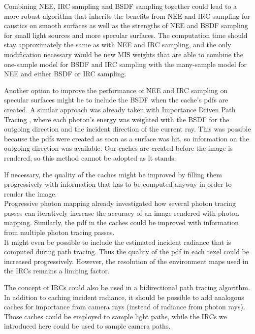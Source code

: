 Combining NEE, IRC sampling and BSDF sampling together could lead to a more robust algorithm that inherits the benefits from NEE and IRC sampling for caustics on smooth surfaces as well as the strengths of NEE and BSDF sampling for small light sources and more specular surfaces. The computation time should stay approximately the same as with NEE and IRC sampling, and the only modification necessary would be new MIS weights that are able to combine the one-sample model for BSDF and IRC sampling with the many-sample model for NEE and either BSDF or IRC sampling.

\newpage
Another option to improve the performance of NEE and IRC sampling on specular surfaces might be to include the BSDF when the cache's pdfs are created. A similar approach was already taken with Importance Driven Path Tracing \cite{idpt}, where each photon's energy was weighted with the BSDF for the outgoing direction and the incident direction of the current ray. This was possible because the pdfs were created as soon as a surface was hit, so information on the outgoing direction was available. Our caches are created before the image is rendered, so this method cannot be adopted as it stands.


If necessary, the quality of the caches might be improved by filling them progressively with information that has to be computed anyway in order to render the image.\\
Progressive photon mapping \cite{ppm} already investigated how several photon tracing passes can iteratively increase the accuracy of an image rendered with photon mapping. Similarly, the pdf in the caches could be improved with information from multiple photon tracing passes.\\
It might even be possible to include the estimated incident radiance that is computed during path tracing. Thus the quality of the pdf in each texel could be increased progressively. However, the resolution of the environment maps used in the IRCs remains a limiting factor.

The concept of IRCs could also be used in a bidirectional path tracing algorithm. In addition to caching incident radiance, it should be possible to add analogous caches for importance from camera rays (instead of radiance from photon rays). Those caches could be employed to sample light paths, while the IRCs we introduced here could be used to sample camera paths.
